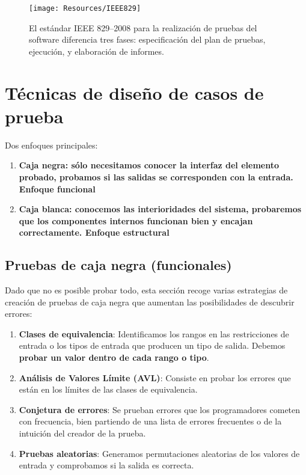 \begin{figure}[H]
    \centering
    \texttt{[image: Resources/IEEE829]}
    \caption{El estándar IEEE 829--2008 para la realización de pruebas del software diferencia tres fases: especificación del plan de pruebas, ejecución, y elaboración de informes.}
    \label{fig:IEEE829}
\end{figure}

\section{Técnicas de diseño de casos de prueba}
Dos enfoques principales:
\begin{enumerate}
    \item \textbf{Caja negra: sólo necesitamos conocer la interfaz del elemento probado, probamos si las salidas se corresponden con la entrada. Enfoque funcional}
    \item \textbf{Caja blanca: conocemos las interioridades del sistema, probaremos que los componentes internos funcionan bien y encajan correctamente. Enfoque estructural}
\end{enumerate}
\subsection{Pruebas de caja negra (funcionales)}

Dado que no es posible probar todo, esta sección recoge varias estrategias de creación de pruebas de caja negra que aumentan las posibilidades de descubrir errores:

\begin{enumerate}
    \item \textbf{Clases de equivalencia}: Identificamos los rangos en las restricciones de entrada o los tipos de entrada que producen un tipo de salida. Debemos \textbf{probar un valor dentro de cada rango o tipo}.
    \item \textbf{\textbf{A}nálisis de \textbf{V}alores \textbf{L}ímite (\textbf{AVL})}: Consiste en probar los errores que están en los límites de las clases de equivalencia.
    \item \textbf{Conjetura de errores}: Se prueban errores que los programadores cometen con frecuencia, bien partiendo de una lista de errores frecuentes o de la intuición del creador de la prueba.
    \item \textbf{Pruebas aleatorias}: Generamos permutaciones aleatorias de los valores de entrada y comprobamos si la salida es correcta.
\end{enumerate}

